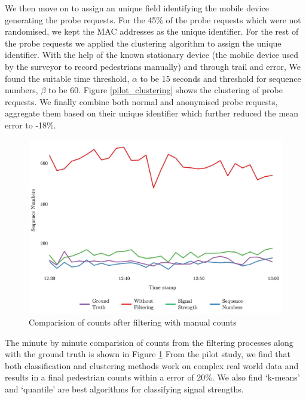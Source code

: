 We then move on to assign an unique field identifying the mobile device generating the probe requests.
For the 45\% of the probe requests which were not randomised, we kept the MAC addresses as the unique identifier.
For the rest of the probe requests we applied the clustering algorithm to assign the unique identifier.
With the help of the known stationary device (the mobile device used by the surveyor to record pedestrians manually) and through trail and error, We found the suitable time threshold, $\alpha$ to be 15 seconds and threshold for sequence numbers, $\beta$ to be 60.
Figure \ref{pilot_clustering} shows the clustering of probe requests.
We finally combine both normal and anonymised probe requests, aggregate them based on their unique identifier which further reduced the mean error to -18\%.

\begin{figure}
	\begin{center}
		\includegraphics [width=0.90\linewidth] {images/pilot_comparison.jpeg}
		\caption{Comparision of counts after filtering with manual counts}
		\label{pilot_comparison}
	\end{center}
\end{figure}

The minute by minute comparision of counts from the filtering processes along with the ground truth is shown in Figure \ref{pilot_comparison} From the pilot study, we find that both classification and clustering methods work on complex real world data and results in a final pedestrian counts within a error of 20\%.
We also find `k-means' and `quantile' are best algorithms for classifying signal strengths.


